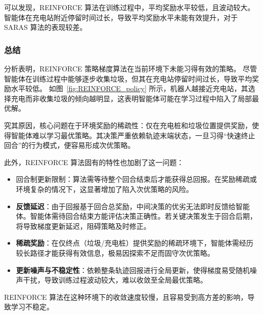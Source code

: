 可以发现，REINFORCE 算法在训练过程中，平均奖励水平较低，且波动较大。智能体在充电站附近停留时间过长，导致平均奖励水平未能有效提升，对于 SARAS 算法的表现较差。

\subsubsection{总结}

分析表明，REINFORCE 策略梯度算法在当前环境下未能习得有效的策略。
尽管智能体在训练过程中能够逐步收集垃圾，但其在充电站停留时间过长，导致平均奖励水平较低。
如图~\ref{fig:REINFORCE_policy} 所示，机器人越接近充电站，其选择充电而非收集垃圾的倾向越明显，这表明智能体可能在学习过程中陷入了局部最优解。

究其原因，核心问题在于环境奖励的稀疏性：仅在充电桩和垃圾位置提供奖励，使得智能体难以学习最优策略。其决策严重依赖轨迹末端状态，一旦习得“快速终止回合”的行为模式，便容易形成次优策略。

此外，REINFORCE 算法固有的特性也加剧了这一问题：
\begin{itemize}
    \item 回合制更新限制：算法需等待整个回合结束后才能获得总回报。在奖励稀疏或环境复杂的情况下，这显著增加了陷入次优策略的风险。
    \item  \textbf{反馈延迟}：由于回报基于回合总奖励，中间决策的优劣无法即时反馈给智能体。智能体需待回合结束方能评估决策正确性。若关键决策发生于回合后期，将导致梯度更新延迟，阻碍策略及时修正。
    \item \textbf{稀疏奖励}：在仅终点（垃圾/充电桩）提供奖励的稀疏环境下，智能体需经历较长路径才能获得有效信息，极易因探索不足而固守次优策略。
    \item \textbf{更新噪声与不稳定性}：依赖整条轨迹回报进行全局更新，使得梯度易受随机噪声干扰，导致训练过程波动较大，难以收敛至全局最优策略。
\end{itemize}

REINFORCE 算法在这种环境下的收敛速度较慢，且容易受到高方差的影响，导致学习不稳定。